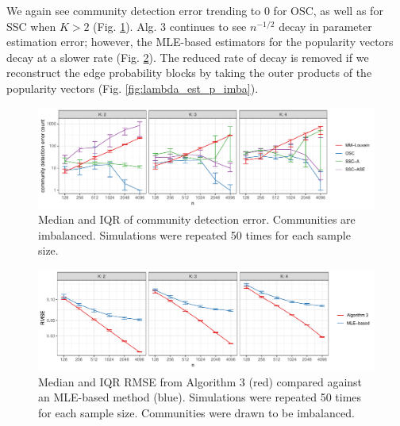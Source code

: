 \documentclass[12pt]{article}
\begin{document}
We again see community detection error trending to 0 for OSC, as well as
for SSC when \(K > 2\) (Fig. \ref{fig:clust_err_ct_sim_imba}). Alg. 3
continues to see \(n^{-1/2}\) decay in parameter estimation error; 
however, the MLE-based estimators for the popularity vectors decay at a slower 
rate (Fig. \ref{fig:lambda_est_k_imba}). 
The reduced rate of decay is removed 
if we reconstruct the edge probability blocks 
by taking the outer products of the popularity vectors 
(Fig. \ref{fig:lambda_est_p_imba}). 

\begin{figure}[H]

{\centering \includegraphics{summary_files/figure-latex/clust_err_ct_sim_imba-1}

}

\caption{Median and IQR of community detection error. Communities are imbalanced. Simulations were repeated 50 times for each sample size.}\label{fig:clust_err_ct_sim_imba}
\end{figure}

\begin{figure}[H]

{\centering \includegraphics{summary_files/figure-latex/lambda_est_k_imba-1}

}

\caption{Median and IQR RMSE from Algorithm 3 (red) compared against an MLE-based method (blue). Simulations were repeated 50 times for each sample size. Communities were drawn to be imbalanced.}\label{fig:lambda_est_k_imba}
\end{figure}
\end{document}
